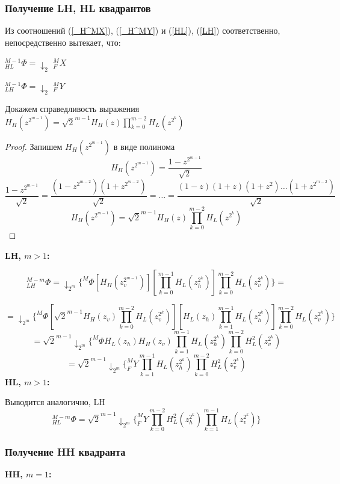 \documentclass{article}
\begin{document}
\subsubsection{Получение LH, HL квадрантов}
Из соотношений (\ref{_H^MX}), (\ref{_H^MY}) и (\ref{HL}), (\ref{LH}) соответственно, непосредственно вытекает, что:
\begin{center}

$ 	_{HL}^{M-1}\Phi = \downarrow_{2}$ $ _F^MX $ 

$ 	_{LH}^{M-1}\Phi = \downarrow_{2}$ $ _F^MY $

\end{center}

Докажем справедливость выражения $H_{H}(z^{2^{m-1}}) = \sqrt{2}^{m-1} H_H(z) \prod \limits_{k=0}^{m-2} H_L(z^{2^k})$
\begin{proof}
Запишем $H_{H}(z^{2^{m-1}})$ в виде полинома
$$H_{H}(z^{2^{m-1}}) = \frac{1 - z^{2^{m-1}}}{\sqrt{2}}$$
$$\frac{1 - z^{2^{m-1}}}{\sqrt{2}} = \frac{(1-z^{2^{m-2}})(1+z^{2^{m-2}})}{\sqrt{2}}=\ldots=\frac{(1-z)(1+z)(1+z^2)\ldots(1+z^{2^{m-2}})}{\sqrt{2}}$$
$$H_{H}(z^{2^{m-1}}) = \sqrt{2}^{m-1} H_H(z) \prod \limits_{k=0}^{m-2} H_L(z^{2^k})$$
\end{proof}

\textbf{LH, $m>1$:}

\[
_{LH}^{M-m}\Phi=
\downarrow_{2^m} \{^M\Phi [H_H(z_v^{2^{m-1}})] [\prod\limits_{k = 0}^{m-1} H_L(z_h^{2^k})]
							\prod\limits_{k = 0}^{m-2} H_L(z_v^{2^k})\}=\]
							
\[
=\downarrow_{2^m} \{^M\Phi [\sqrt{2}^{m-1} H_H(z_v) \prod \limits_{k=0}^{m-2} H_L(z_v^{2^k})]
					[H_L(z_h)\prod \limits_{k=1}^{m-1} H_L(z_h^{2^k})]
					\prod\limits_{k = 0}^{m-2} H_L(z_v^{2^k})
\}			
\]
\[
=\sqrt{2}^{m-1} \downarrow_{2^m} \{^M\Phi H_L(z_h) H_H(z_v)\prod \limits_{k=1}^{m-1} H_L(z_h^{2^k})\prod \limits_{k=0}^{m-2} H_L^2(z_v^{2^k})
\]
\[
=\sqrt{2}^{m-1} \downarrow_{2^m} \{_F^MY \prod \limits_{k=1}^{m-1} H_L(z_h^{2^k})\prod \limits_{k=0}^{m-2} H_L^2(z_v^{2^k})
\]
\textbf{HL, $m>1$:}

Выводится аналогично, LH
\[_{HL}^{M-m}\Phi=
\sqrt{2}^{m-1} \downarrow_{2^m} \{_F^MY \prod \limits_{k=0}^{m-2} H_L^{2}(z_h^{2^k})\prod \limits_{k=1}^{m-1} H_L(z_v^{2^k})\}
\]

\subsubsection{Получение HH квадранта}
\textbf{HH, $m=1$:}\cite{new_method2}
\end{document}
